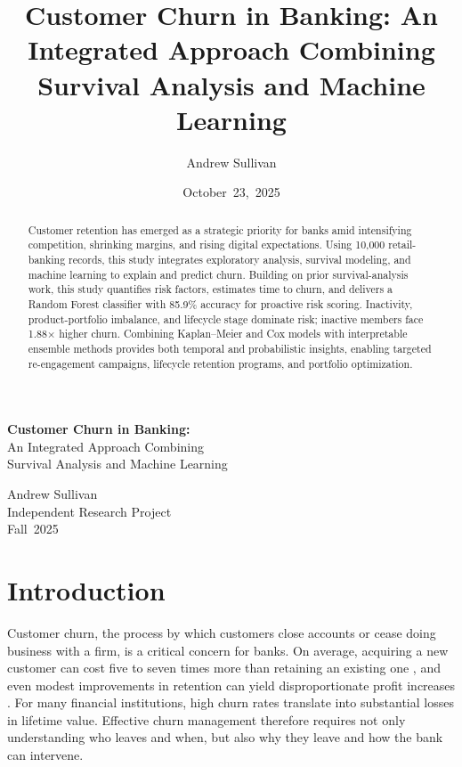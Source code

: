 \documentclass[12pt]{article}
\title{Customer Churn in Banking: An Integrated Approach Combining Survival Analysis and Machine Learning}
\author{Andrew Sullivan}
\date{October~23,~2025}
\begin{document}
\begin{titlepage}
  \centering
  \vspace*{2cm}
  \Huge\textbf{Customer Churn in Banking:}\\An Integrated Approach Combining\\Survival Analysis and Machine Learning
  \vspace{1.5cm}

  \large
  Andrew Sullivan\\[0.5cm]
  Independent Research Project\\[0.5cm]
  Fall~2025
  
  \vfill
\end{titlepage}

\newpage
\begin{abstract}
Customer retention has emerged as a strategic priority for banks amid intensifying competition, shrinking margins, and rising digital expectations. Using 10,000 retail-banking records, this study integrates exploratory analysis, survival modeling, and machine learning to explain and predict churn. Building on prior survival-analysis work, this study quantifies risk factors, estimates time to churn, and delivers a Random Forest classifier with 85.9\% accuracy for proactive risk scoring. Inactivity, product-portfolio imbalance, and lifecycle stage dominate risk; inactive members face 1.88× higher churn. Combining Kaplan–Meier and Cox models with interpretable ensemble methods provides both temporal and probabilistic insights, enabling targeted re-engagement campaigns, lifecycle retention programs, and portfolio optimization.
\end{abstract}

\newpage
{}
\tableofcontents
\newpage
{}

\section{Introduction}
Customer churn, the process by which customers close accounts or cease doing business with a firm, is a critical concern for banks. On average, acquiring a new customer can cost five to seven times more than retaining an existing one \citep{businessbuilders2024cost}, and even modest improvements in retention can yield disproportionate profit increases \citep{kumar2022customerretention}. For many financial institutions, high churn rates translate into substantial losses in lifetime value. Effective churn management therefore requires not only understanding who leaves and when, but also why they leave and how the bank can intervene.
\end{document}
